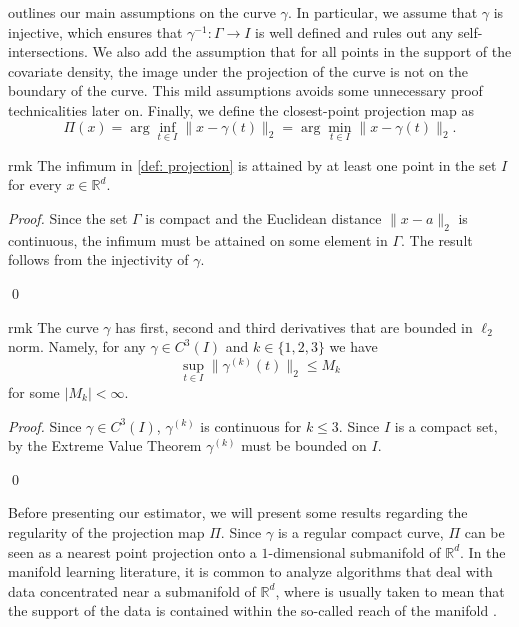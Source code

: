\documentclass[11pt]{article}
\begin{document}
 outlines our main assumptions on the curve $\gamma$. In particular, we assume that $\gamma$ is injective, which ensures that $\gamma^{-1}:\Gamma\rightarrow I$ is well defined and rules out any self-intersections. We also add the assumption that for all points in the support of the covariate density, the image under the projection of the curve is not on the boundary of the curve. This mild assumptions avoids some unnecessary proof technicalities later on. Finally, we define the closest-point projection map as
\begin{equation}\label{def: projection}
\Pi(x) = \arg\inf_{t\in I}\|x - \gamma(t)\|_2 = \arg\min_{t\in I}\|x - \gamma(t)\|_2.
\end{equation}
\begin{restatable}{rmk}{} \label{remark: infimum}
    The infimum in \cref{def: projection} is attained by at least one point in the set $I$ for every $x \in \mathbb{R}^d$.
\end{restatable}
\noindent \textit{Proof.} Since the set $\Gamma$ is compact and the Euclidean distance $\|x-a\|_2$ is continuous, the infimum must be attained on some element in $\Gamma$. The result follows from the injectivity of $\gamma$. 

\qed{}


\begin{restatable}{rmk}{} \label{remark: deriv bound}
    The curve $\gamma$ has first, second and third derivatives that are bounded in $\ell_2$ norm. Namely, for any $\gamma \in C^3(I)$ and $k \in \{1,2,3\}$ we have 
    \[\sup_{t\in I}\|\gamma^{(k)}(t)\|_2 \leq M_k\]
    for some $|M_k| < \infty$.
\end{restatable}
\noindent \textit{Proof.} Since $\gamma \in C^3(I)$, $\gamma^{(k)}$ is continuous for $k \leq 3$. Since $I$ is a compact set, by the Extreme Value Theorem $\gamma^{(k)}$ must be bounded on $I$. 

\qed{}



Before presenting our estimator, we will present some results regarding the regularity of the projection map $\Pi$. Since $\gamma$ is a regular compact curve, $\Pi$ can be seen as a nearest point projection onto a $1$-dimensional submanifold of $\mathbb{R}^d$. In the manifold learning literature, it is common to analyze algorithms that deal with data concentrated near a submanifold of $\mathbb{R}^d$, where  is usually taken to mean that the support of the data is contained within the so-called reach of the manifold \cite{genovese2012minimax, balakrishnan2012minimax, kokotnoisy, saidi2024recovering}.
\end{document}

